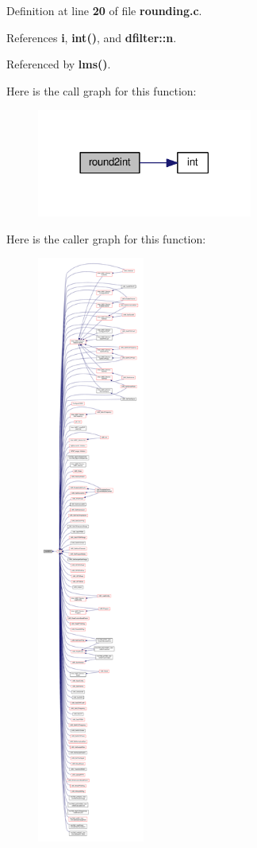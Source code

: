 Definition at line {\bf 20} of file {\bf rounding.\+c}.



References {\bf i}, {\bf int()}, and {\bf dfilter\+::n}.



Referenced by {\bf lms()}.



Here is the call graph for this function\+:
\nopagebreak
\begin{figure}[H]
\begin{center}
\leavevmode
\includegraphics[width=201pt]{d8/d91/rounding_8c_aca2670cc0fbf948a6b9cb670047c9d5b_cgraph}
\end{center}
\end{figure}




Here is the caller graph for this function\+:
\nopagebreak
\begin{figure}[H]
\begin{center}
\leavevmode
\includegraphics[height=550pt]{d8/d91/rounding_8c_aca2670cc0fbf948a6b9cb670047c9d5b_icgraph}
\end{center}
\end{figure}


